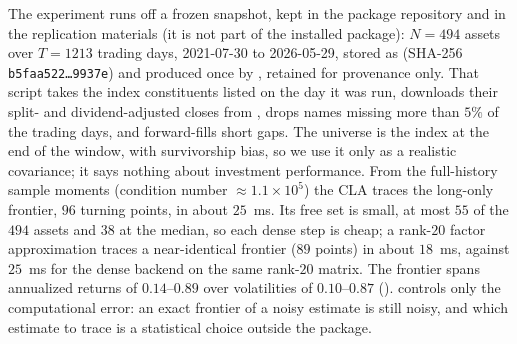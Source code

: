 The experiment runs off a frozen snapshot, kept in the package repository and in the
replication materials (it is not part of the installed package):
$N = 494$ assets over $T = 1213$ trading days, 2021-07-30 to 2026-05-29, stored as
(SHA-256 \texttt{b5faa522\ldots9937e}) and produced once by
, retained for provenance only.
That script takes the index constituents listed on the day it was run, downloads their
split- and dividend-adjusted closes from , drops names missing more than
$5\%$ of the trading days, and forward-fills short gaps. The universe is the index at the end of the window, with survivorship bias, so we use it
only as a realistic covariance; it says nothing about investment performance. From the
full-history sample moments (condition number $\approx 1.1\times 10^{5}$) the CLA
traces the long-only frontier, $96$ turning points, in about $25$~ms. Its free set is
small, at most $55$ of the $494$ assets and $38$ at the median, so each dense step is
cheap;
a rank-$20$ factor approximation traces a
near-identical frontier ($89$ points) in about $18$~ms, against $25$~ms for the dense
backend on the same rank-$20$ matrix. The frontier spans annualized
returns of $0.14$--$0.89$ over volatilities of $0.10$--$0.87$ ().
 controls only the computational error: an exact frontier of a noisy
estimate is still noisy, and which estimate to trace is a statistical choice outside
the package.

